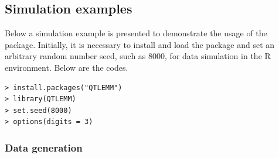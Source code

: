 \begin{table}
	\centering
	\caption{The format example of genotype data}
	\label{t3}
	\centering
\end{table}

\subsection{Simulation examples}

Below a simulation example is presented to demonstrate the usage of the  package. Initially, it is necessary to install and load the  package and set an arbitrary random number seed, such as 8000, for data simulation in the R environment. Below are the codes. 

\begin{verbatim}
> install.packages("QTLEMM")
> library(QTLEMM)
> set.seed(8000)
> options(digits = 3)
\end{verbatim}

\subsubsection{Data generation}

